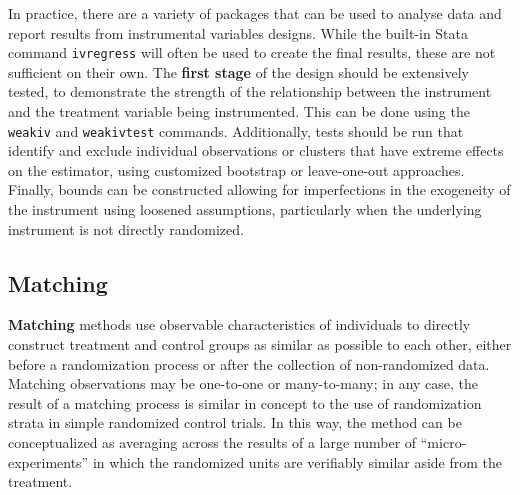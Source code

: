 In practice, there are a variety of packages that can be used
to analyse data and report results from instrumental variables designs.
While the built-in Stata command \texttt{ivregress} will often be used
to create the final results, these are not sufficient on their own.
The \textbf{first stage} of the design should be extensively tested,
to demonstrate the strength of the relationship between
the instrument and the treatment variable being instrumented.\cite{stock2005weak}
This can be done using the \texttt{weakiv} and \texttt{weakivtest} commands.
Additionally, tests should be run that identify and exclude individual
observations or clusters that have extreme effects on the estimator,
using customized bootstrap or leave-one-out approaches.
Finally, bounds can be constructed allowing for imperfections
in the exogeneity of the instrument using loosened assumptions,
particularly when the underlying instrument is not directly randomized.


\subsection{Matching}

\textbf{Matching} methods use observable characteristics of individuals
to directly construct treatment and control groups as similar as possible
to each other, either before a randomization process
or after the collection of non-randomized data.
Matching observations may be one-to-one or many-to-many;
in any case, the result of a matching process
is similar in concept to the use of randomization strata
in simple randomized control trials.
In this way, the method can be conceptualized
as averaging across the results of a large number of ``micro-experiments''
in which the randomized units are verifiably similar aside from the treatment.

